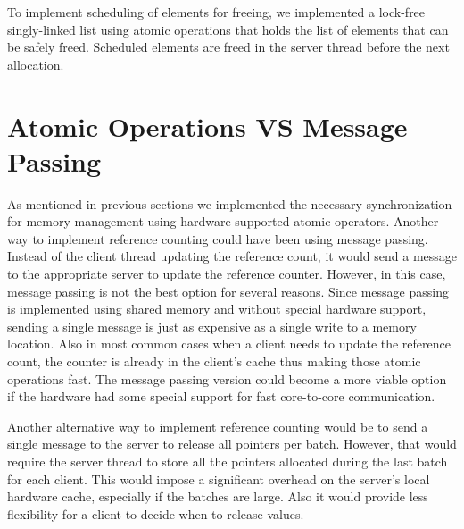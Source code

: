 To implement scheduling of elements for freeing, we implemented a lock-free singly-linked list using atomic operations that holds 
the list of elements that can be safely freed. Scheduled elements are freed in the server thread before the next allocation.

\section{Atomic Operations VS Message Passing}

As mentioned in previous sections we implemented the necessary synchronization for memory management using hardware-supported atomic 
operators. Another way to implement reference counting could have been using message passing. Instead of the client thread 
updating the reference count, it would send a message to the appropriate server to update the reference counter. However, in this 
case, message passing is not the best option for several reasons. Since message passing is implemented 
using shared memory and without special hardware support, sending a single message is just as expensive as a single write 
to a memory location. Also in most common cases when a client needs to update the reference count, the counter is already in 
the client's cache thus making those atomic operations fast. The message passing version could become a more viable option 
if the hardware had some special support for fast core-to-core communication.

Another alternative way to implement reference counting would be to send a single message to the server to release all pointers 
per batch. However, that would require the server thread to store all the pointers allocated during the last batch for each client. 
This would impose a significant overhead on the server's local hardware cache, especially if the batches are large. Also it would provide less 
flexibility for a client to decide when to release values.
